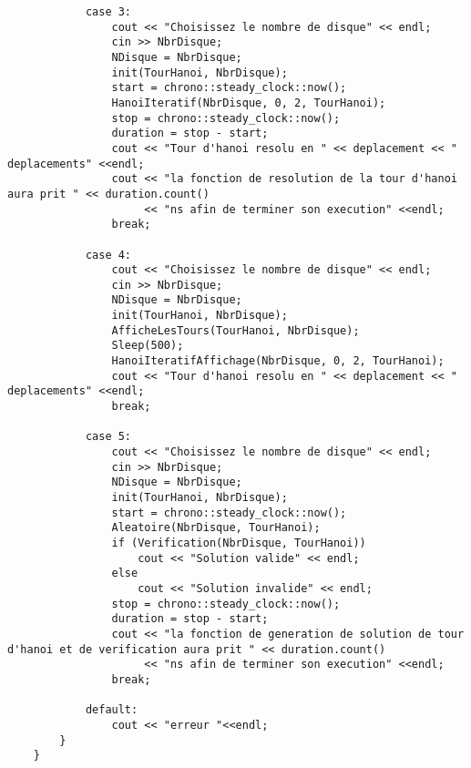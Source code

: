\begin{verbatim}
            case 3:
                cout << "Choisissez le nombre de disque" << endl;
                cin >> NbrDisque;
                NDisque = NbrDisque;
                init(TourHanoi, NbrDisque);
                start = chrono::steady_clock::now();
                HanoiIteratif(NbrDisque, 0, 2, TourHanoi);
                stop = chrono::steady_clock::now();
                duration = stop - start;
                cout << "Tour d'hanoi resolu en " << deplacement << " deplacements" <<endl;
                cout << "la fonction de resolution de la tour d'hanoi aura prit " << duration.count()
                     << "ns afin de terminer son execution" <<endl;
                break;
    
            case 4:
                cout << "Choisissez le nombre de disque" << endl;
                cin >> NbrDisque;
                NDisque = NbrDisque;
                init(TourHanoi, NbrDisque);
                AfficheLesTours(TourHanoi, NbrDisque);
                Sleep(500);
                HanoiIteratifAffichage(NbrDisque, 0, 2, TourHanoi);
                cout << "Tour d'hanoi resolu en " << deplacement << " deplacements" <<endl;
                break;
    
            case 5:
                cout << "Choisissez le nombre de disque" << endl;
                cin >> NbrDisque;
                NDisque = NbrDisque;
                init(TourHanoi, NbrDisque);
                start = chrono::steady_clock::now();
                Aleatoire(NbrDisque, TourHanoi);
                if (Verification(NbrDisque, TourHanoi))
                    cout << "Solution valide" << endl;
                else
                    cout << "Solution invalide" << endl;
                stop = chrono::steady_clock::now();
                duration = stop - start;
                cout << "la fonction de generation de solution de tour d'hanoi et de verification aura prit " << duration.count()
                     << "ns afin de terminer son execution" <<endl;
                break;
    
            default:
                cout << "erreur "<<endl;
        }
    }
\end{verbatim}

